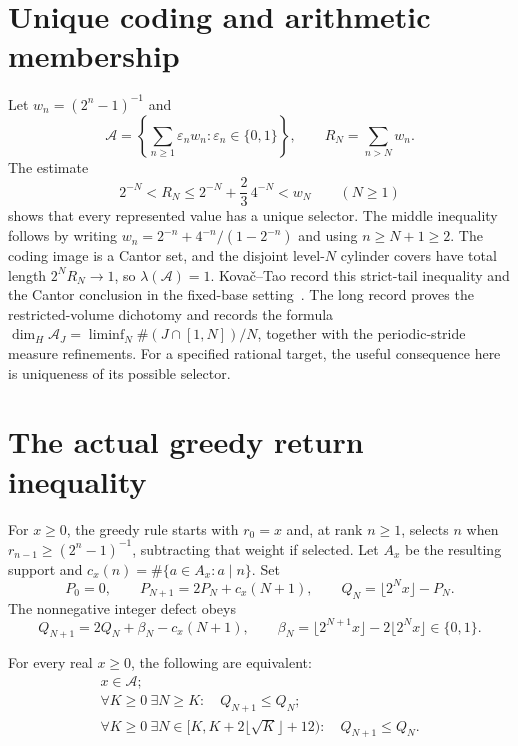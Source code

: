 \documentclass[11pt]{article}
\newcommand{\Ach}{\mathcal A}
\begin{document}
\section{Unique coding and arithmetic membership}\label{sec:geometry}
Let $w_n=(2^n-1)^{-1}$ and
\[
 \Ach=\left\{\sum_{n\ge1}\varepsilon_nw_n:
                   \varepsilon_n\in\{0,1\}\right\},\qquad
 R_N=\sum_{n>N}w_n.
\]
The estimate
\[
 2^{-N}<R_N\le2^{-N}+\frac23\,4^{-N}<w_N\qquad(N\ge1)
\]
shows that every represented value has a unique selector.
The middle inequality follows by writing
$w_n=2^{-n}+4^{-n}/(1-2^{-n})$ and using $n\ge N+1\ge2$.
The coding image is a Cantor set, and the disjoint level-$N$ cylinder
covers have total length $2^NR_N\to1$, so $\lambda(\Ach)=1$.
Kova\v{c}--Tao record this strict-tail inequality and the Cantor conclusion in the fixed-base setting~\cite[Remark~4.1]{kovactao}.
The long record proves the restricted-volume dichotomy and records the
formula $\dim_H\Ach_J=\liminf_N\#(J\cap[1,N])/N$, together with the
periodic-stride measure refinements.  For a specified rational target,
the useful consequence here is uniqueness of its possible selector.

\section{The actual greedy return inequality}\label{sec:actual-repairs}
For $x\ge0$, the greedy rule starts with $r_0=x$ and, at rank $n\ge1$,
selects $n$ when $r_{n-1}\ge(2^n-1)^{-1}$, subtracting that weight if
selected.  Let $A_x$ be the resulting support and
$c_x(n)=\#\{a\in A_x:a\mid n\}$.  Set
\[
 P_0=0,\qquad P_{N+1}=2P_N+c_x(N+1),\qquad
 Q_N=\lfloor2^Nx\rfloor-P_N.
\]
The nonnegative integer defect obeys
\begin{equation}
 Q_{N+1}=2Q_N+\beta_N-c_x(N+1),\qquad
 \beta_N=\lfloor2^{N+1}x\rfloor-2\lfloor2^Nx\rfloor\in\{0,1\}.
 \label{eq:actual-repair-recurrence}
\end{equation}

\begin{theorem}\label{res:general-repair}
For every real $x\ge0$, the following are equivalent:
\[
 \begin{gathered}
 x\in\Ach;\\
 \forall K\ge0\ \exists N\ge K:\quad Q_{N+1}\le Q_N;\\
 \forall K\ge0\ \exists N\in[K,K+2\lfloor\sqrt K\rfloor+12):
 \quad Q_{N+1}\le Q_N.
 \end{gathered}
\]
\end{theorem}
\end{document}

